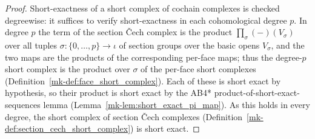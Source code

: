 \begin{proof}
  \leanok
  Short-exactness of a short complex of cochain complexes is checked degreewise: it suffices to
  verify short-exactness in each cohomological degree \(p\). In degree \(p\) the term of the
  section {\v C}ech complex is the product \(\prod_{\sigma}(-)(V_\sigma)\) over all tuples
  \(\sigma : \{0, \ldots, p\} \to \iota\) of section groups over the basic opens \(V_\sigma\), and
  the two maps are the products of the corresponding per-face maps; thus the degree-\(p\) short
  complex is the product over \(\sigma\) of the per-face short complexes
  (Definition~\ref{mk-def:face_short_complex}). Each of these is short exact by hypothesis, so their
  product is short exact by the AB4* product-of-short-exact-sequences lemma
  (Lemma~\ref{mk-lem:short_exact_pi_map}). As this holds in every degree, the short complex of section
  {\v C}ech complexes (Definition~\ref{mk-def:section_cech_short_complex}) is short exact.
\end{proof}

